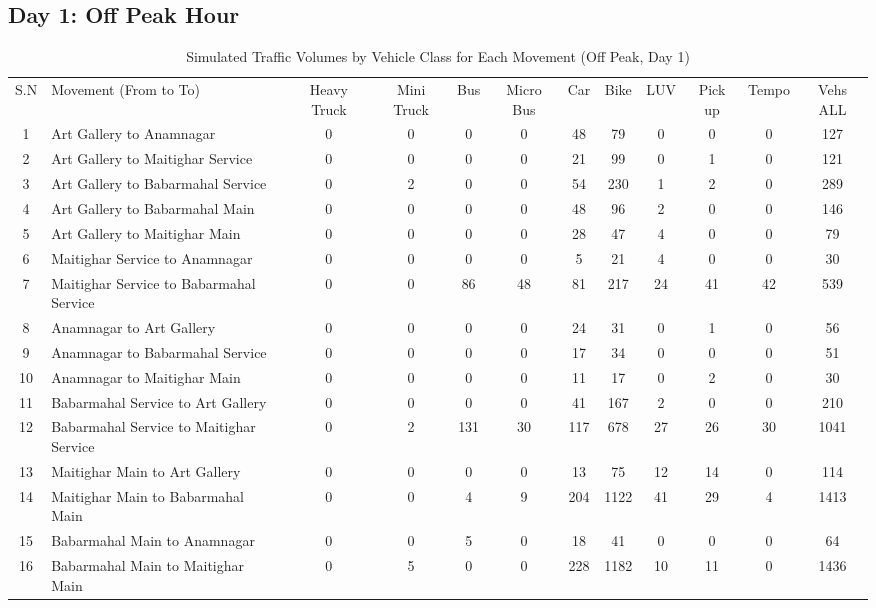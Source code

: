 \begin{landscape}
\section{Day 1: Off Peak Hour}
\begin{table}[h!]
\centering
\caption{Simulated Traffic Volumes by Vehicle Class for Each Movement (Off Peak, Day 1)}
\small
\setlength{\tabcolsep}{5pt}

\begin{tabular}{|c|p{6cm}|c|c|c|c|c|c|c|c|c|c|}
\hline
S.N& Movement (From to To)& Heavy Truck & Mini Truck & Bus & Micro Bus & Car & Bike & LUV & Pick up & Tempo & Vehs ALL \\
1	&Art Gallery to Anamnagar	&0	&0	&0	&0	&48	&79	&0	&0	&0	&127 \\ \hline
2	&Art Gallery to Maitighar Service	&0	&0	&0	&0	&21	&99	&0	&1	&0	&121 \\ \hline
3	&Art Gallery to Babarmahal Service	&0	&2	&0	&0	&54	&230	&1	&2	&0	&289 \\ \hline
4	&Art Gallery to Babarmahal Main	&0	&0	&0	&0	&48	&96	&2	&0	&0	&146 \\ \hline
5	&Art Gallery to Maitighar Main	&0	&0	&0	&0	&28	&47	&4	&0	&0	&79 \\ \hline
6	&Maitighar Service to Anamnagar	&0	&0	&0	&0	&5	&21	&4	&0	&0	&30 \\ \hline
7	&Maitighar Service to Babarmahal Service	&0	&0	&86	&48	&81	&217	&24	&41	&42	&539 \\ \hline
8	&Anamnagar to Art Gallery	&0	&0	&0	&0	&24	&31	&0	&1	&0	&56 \\ \hline
9	&Anamnagar to Babarmahal Service	&0	&0	&0	&0	&17	&34	&0	&0	&0	&51 \\ \hline
10	&Anamnagar to Maitighar Main	&0	&0	&0	&0	&11	&17	&0	&2	&0	&30 \\ \hline
11	&Babarmahal Service to Art Gallery	&0	&0	&0	&0	&41	&167	&2	&0	&0	&210 \\ \hline
12	&Babarmahal Service to Maitighar Service	&0	&2	&131	&30	&117	&678	&27	&26	&30	&1041 \\ \hline
13	&Maitighar Main to Art Gallery	&0	&0	&0	&0	&13	&75	&12	&14	&0	&114 \\ \hline
14	&Maitighar Main to Babarmahal Main	&0	&0	&4	&9	&204 &1122 &41 &29& 4& 1413 \\ \hline
15	&Babarmahal Main to Anamnagar& 0 &0 &5 &0 &18 &41& 0& 0 &0 &64 \\ \hline
16	&Babarmahal Main to Maitighar Main& 0& 5& 0& 0& 228 &1182&10&11&0&1436 \\ \hline

\end{tabular}
\end{table}
\end{landscape}


